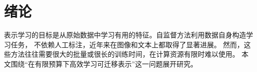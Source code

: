 \chapter{绪论}
\label{ch:introduction}

表示学习的目标是从原始数据中学习有用的特征。自监督方法利用数据自身构造学习任务，
不依赖人工标注，近年来在图像和文本上都取得了显著进展\cite{chen2020simclr,he2020moco}。
然而，这些方法往往需要很大的批量或很长的训练时间，在计算资源有限时难以使用。
本文围绕“在有限预算下高效学习可迁移表示”这一问题展开研究。
